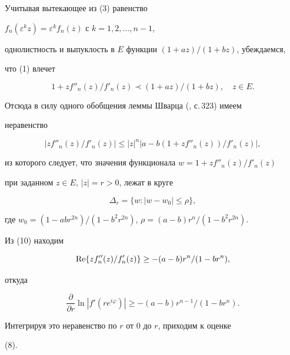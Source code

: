  


\begin{pf} 


Учитывая вытекающее из (3) равенство 


$f_n(\varepsilon^k z){=}\varepsilon^k f_n(z)$ с $k{=}1,2,\dotsc,n{-}1$, 


однолистность и выпуклость в $E$ функции $(1+az)/(1+bz)$, убеждаемся, 


что (1) влечет 


\begin{equation} 


1+z f''_n(z)/f'_n(z)\prec (1+az)/(1+bz),\quad z\in E. 


\end{equation} 


Отсюда в силу одного обобщения леммы Шварца (\cite{4}, с.\,323) имеем 


неравенство 


$$ 


|z f''_n(z)/f'_n(z)|\le |z|^n|a-b(1+z f''_n(z))/f'_n(z)|, 


$$ 


из которого следует, что значения функционала $w=1+z f''_n(z)/f'_n(z)$ 


при заданном $z\in E$, $|z|=r>0$, лежат в круге 


\begin{equation} 


\Delta_r=\{w:|w-w_0|\le\rho\}, 


\end{equation} 


где $w_0=(1-ab r^{2n})/(1-b^2r^{2n})$, $\rho=(a-b)r^n/(1-b^2r^{2n})$. 


Из (10) находим 


$$ 


\re\{z f''_n(z)/f'_n(z)\}\ge -(a-b)r^n/(1-br^n), 


$$ 


откуда 


$$ 


\frac{\partial}{\partial r}\ln|f'(r e^{i\varphi})|\ge 


-(a-b)r^{n-1}/(1-b r^n). 


$$ 


Интегрируя это неравенство по $r$ от $0$ до $r$, приходим к оценке 


(8). 


\end{pf} 


 


